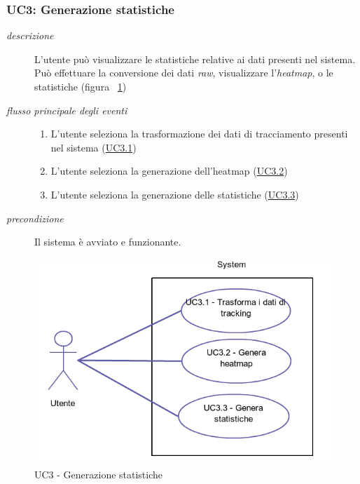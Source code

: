 \subsubsection{UC3: Generazione statistiche} \label{sec:UC3}
\begin{description}
\item[\em{descrizione }]L'utente può visualizzare le statistiche relative ai dati presenti nel sistema. Può effettuare la conversione dei dati \textit{raw}, visualizzare l'\textit{heatmap}, o le statistiche (figura ~\ref{fig:uc3})
\item[\em{flusso principale degli eventi }] \mbox{}
\begin{enumerate}
\item L'utente seleziona la trasformazione dei dati di tracciamento presenti nel sistema (\hyperref[sec:uc3.1]{UC3.1})
\item L'utente seleziona la generazione dell'heatmap (\hyperref[sec:uc3.2]{UC3.2})
\item L'utente seleziona la generazione delle statistiche (\hyperref[sec:uc3.3]{UC3.3})
\end{enumerate}
\item[\em{precondizione }] Il sistema è avviato e funzionante.
\end{description}

\begin{figure}[htpb] 
\centering 
\includegraphics[scale=0.4]{./images/uc3.png} 
\caption{UC3 - Generazione statistiche} 
\label{fig:uc3}
\end{figure} 

